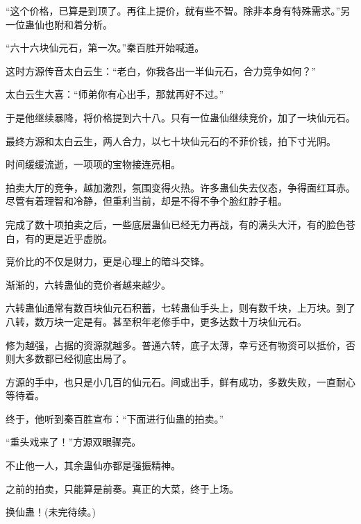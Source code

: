 \begin{this_body}
“这个价格，已算是到顶了。再往上提价，就有些不智。除非本身有特殊需求。”另一位蛊仙也附和着分析。

“六十六块仙元石，第一次。”秦百胜开始喊道。

这时方源传音太白云生：“老白，你我各出一半仙元石，合力竞争如何？”

太白云生大喜：“师弟你有心出手，那就再好不过。”

于是他继续暴降，将价格提到六十八。只有一位蛊仙继续竞价，加了一块仙元石。

最终方源和太白云生，两人合力，以七十块仙元石的不菲价钱，拍下寸光阴。

时间缓缓流逝，一项项的宝物接连亮相。

拍卖大厅的竞争，越加激烈，氛围变得火热。许多蛊仙失去仪态，争得面红耳赤。尽管有着理智和冷静，但重利当前，却是不得不争个脸红脖子粗。

完成了数十项拍卖之后，一些底层蛊仙已经无力再战，有的满头大汗，有的脸色苍白，有的更是近乎虚脱。

竞价比的不仅是财力，更是心理上的暗斗交锋。

渐渐的，六转蛊仙的竞价者越来越少。

六转蛊仙通常有数百块仙元石积蓄，七转蛊仙手头上，则有数千块，上万块。到了八转，数万块一定是有。甚至积年老修手中，更多达数十万块仙元石。

修为越强，占据的资源就越多。普通六转，底子太薄，幸亏还有物资可以抵价，否则大多数都已经彻底出局了。

方源的手中，也只是小几百的仙元石。间或出手，鲜有成功，多数失败，一直耐心等待着。

终于，他听到秦百胜宣布：“下面进行仙蛊的拍卖。”

“重头戏来了！”方源双眼骤亮。

不止他一人，其余蛊仙亦都是强振精神。

之前的拍卖，只能算是前奏。真正的大菜，终于上场。

换仙蛊！(未完待续。)

\end{this_body}

